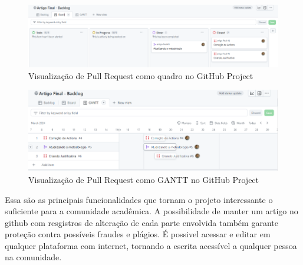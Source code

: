 \begin{figure}[ht]
	\centering
	\includegraphics[width=.5\textwidth]{./images/fig08.png}
	\caption{Visualização de Pull Request como quadro no GitHub Project}
	\label{fig:fig08}
\end{figure}

\begin{figure}[ht]
	\centering
	\includegraphics[width=.5\textwidth]{./images/fig09.png}
	\caption{Visualização de Pull Request como GANTT no GitHub Project}
	\label{fig:fig09}
\end{figure}

Essa são as principais funcionalidades que tornam o projeto interessante o suficiente para a comunidade acadêmica. A possibilidade de manter um artigo no github com resgistros de alteração de cada parte envolvida também garante proteção contra possíveis fraudes e plágios. É possivel acessar e editar em qualquer plataforma com internet, tornando a escrita acessível a qualquer pessoa na comunidade.
